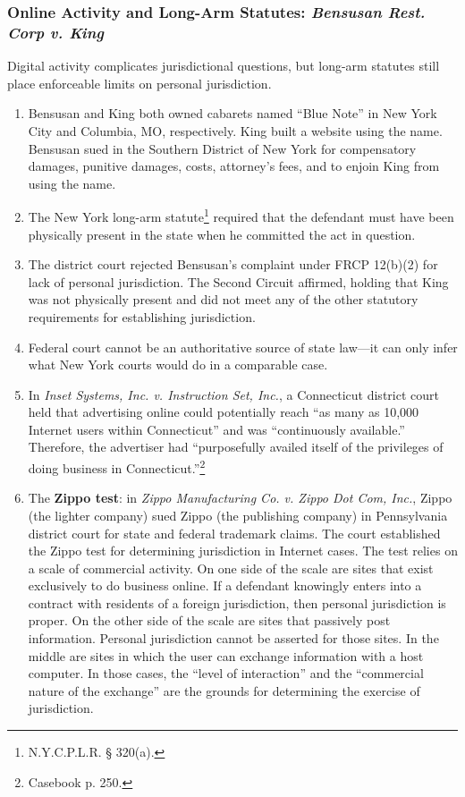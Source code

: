 \subsubsection{Online Activity and Long-Arm Statutes: \emph{Bensusan Rest. Corp 
v. King}}

Digital activity complicates jurisdictional questions, but long-arm statutes 
still place enforceable limits on personal jurisdiction.

\begin{enumerate}
    \item Bensusan and King both owned cabarets named ``Blue Note'' in New 
    York City and Columbia, MO, respectively. King built a website using the 
    name. Bensusan sued in the Southern District of New York for compensatory 
    damages, punitive damages, costs, attorney's fees, and to enjoin King from 
    using the name.
    \item The New York long-arm statute\footnote{N.Y.C.P.L.R. § 320(a).} required that 
    the defendant must have been physically present in the state when he 
    committed the act in question.
    \item The district court rejected Bensusan's complaint under FRCP 12(b)(2) 
    for lack of personal jurisdiction. The Second Circuit affirmed, holding
    that King was not physically present and did not meet any of the other 
    statutory requirements for establishing jurisdiction.
    \item Federal court cannot be an authoritative source of state law---it 
    can only infer what New York courts would do in a comparable case.
    \item In \emph{Inset Systems, Inc. v. Instruction Set, Inc.}, a 
    Connecticut district court held that advertising online could potentially 
    reach ``as many as 10,000 Internet users within Connecticut'' and was 
    ``continuously available.'' Therefore, the advertiser had ``purposefully 
    availed itself of the privileges of doing business in 
    Connecticut.''\footnote{Casebook p. 250.}
    \item The \textbf{Zippo test}: in \emph{Zippo Manufacturing Co. v. Zippo 
    Dot Com, Inc.}, Zippo (the lighter company) sued Zippo (the publishing 
    company) in Pennsylvania district court for state and federal trademark 
    claims. The court established the Zippo test for determining jurisdiction 
    in Internet cases. The test relies on a scale of commercial activity. On 
    one side of the scale are sites that exist exclusively to do business 
    online.  If a defendant knowingly enters into a contract with residents of 
    a foreign jurisdiction, then personal jurisdiction is proper. On the other 
    side of the scale are sites that passively post information. Personal 
    jurisdiction cannot be asserted for those sites. In the middle are sites 
    in which the user can exchange information with a host computer. In those 
    cases, the ``level of interaction'' and the ``commercial nature of the 
    exchange'' are the grounds for determining the exercise of jurisdiction.  
    \end{enumerate}

